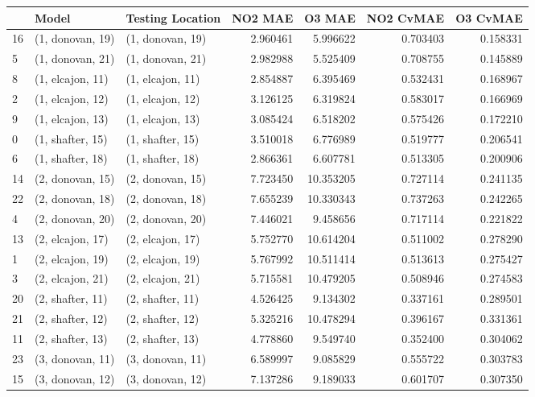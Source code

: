 \begin{tabular}{lllrrrr}
\toprule
{} &             Model &  Testing Location &   NO2 MAE &     O3 MAE &  NO2 CvMAE &  O3 CvMAE \\
\midrule
16 &  (1, donovan, 19) &  (1, donovan, 19) &  2.960461 &   5.996622 &   0.703403 &  0.158331 \\
5  &  (1, donovan, 21) &  (1, donovan, 21) &  2.982988 &   5.525409 &   0.708755 &  0.145889 \\
8  &  (1, elcajon, 11) &  (1, elcajon, 11) &  2.854887 &   6.395469 &   0.532431 &  0.168967 \\
2  &  (1, elcajon, 12) &  (1, elcajon, 12) &  3.126125 &   6.319824 &   0.583017 &  0.166969 \\
9  &  (1, elcajon, 13) &  (1, elcajon, 13) &  3.085424 &   6.518202 &   0.575426 &  0.172210 \\
0  &  (1, shafter, 15) &  (1, shafter, 15) &  3.510018 &   6.776989 &   0.519777 &  0.206541 \\
6  &  (1, shafter, 18) &  (1, shafter, 18) &  2.866361 &   6.607781 &   0.513305 &  0.200906 \\
14 &  (2, donovan, 15) &  (2, donovan, 15) &  7.723450 &  10.353205 &   0.727114 &  0.241135 \\
22 &  (2, donovan, 18) &  (2, donovan, 18) &  7.655239 &  10.330343 &   0.737263 &  0.242265 \\
4  &  (2, donovan, 20) &  (2, donovan, 20) &  7.446021 &   9.458656 &   0.717114 &  0.221822 \\
13 &  (2, elcajon, 17) &  (2, elcajon, 17) &  5.752770 &  10.614204 &   0.511002 &  0.278290 \\
1  &  (2, elcajon, 19) &  (2, elcajon, 19) &  5.767992 &  10.511414 &   0.513613 &  0.275427 \\
3  &  (2, elcajon, 21) &  (2, elcajon, 21) &  5.715581 &  10.479205 &   0.508946 &  0.274583 \\
20 &  (2, shafter, 11) &  (2, shafter, 11) &  4.526425 &   9.134302 &   0.337161 &  0.289501 \\
21 &  (2, shafter, 12) &  (2, shafter, 12) &  5.325216 &  10.478294 &   0.396167 &  0.331361 \\
11 &  (2, shafter, 13) &  (2, shafter, 13) &  4.778860 &   9.549740 &   0.352400 &  0.304062 \\
23 &  (3, donovan, 11) &  (3, donovan, 11) &  6.589997 &   9.085829 &   0.555722 &  0.303783 \\
15 &  (3, donovan, 12) &  (3, donovan, 12) &  7.137286 &   9.189033 &   0.601707 &  0.307350 \\

\end{tabular}
